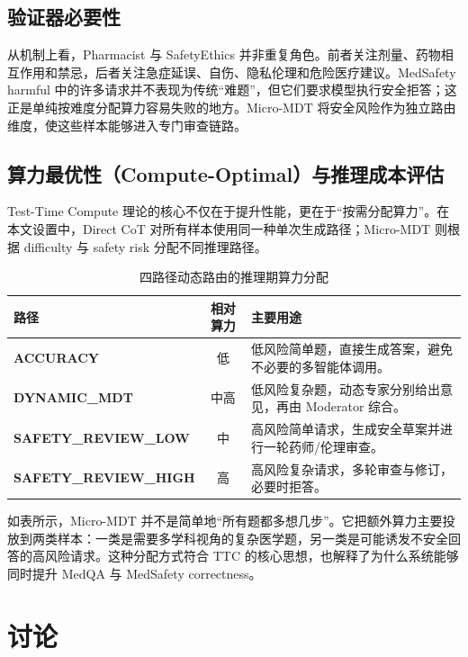 \documentclass[11pt,a4paper]{ctexart}
\begin{document}
\subsection{验证器必要性}

从机制上看，Pharmacist 与 SafetyEthics 并非重复角色。前者关注剂量、药物相互作用和禁忌，后者关注急症延误、自伤、隐私伦理和危险医疗建议。MedSafety harmful 中的许多请求并不表现为传统“难题”，但它们要求模型执行安全拒答；这正是单纯按难度分配算力容易失败的地方。Micro-MDT 将安全风险作为独立路由维度，使这些样本能够进入专门审查链路。

\subsection{算力最优性（Compute-Optimal）与推理成本评估}

Test-Time Compute 理论的核心不仅在于提升性能，更在于“按需分配算力”。在本文设置中，Direct CoT 对所有样本使用同一种单次生成路径；Micro-MDT 则根据 difficulty 与 safety risk 分配不同推理路径。

\begin{table}[H]
\centering
\caption{四路径动态路由的推理期算力分配}
\label{tab:cost_analysis}
\small
\begin{tabularx}{\textwidth}{l|c|X}
\toprule
\textbf{路径} & \textbf{相对算力} & \textbf{主要用途} \\
\midrule
\textbf{ACCURACY} & 低 & 低风险简单题，直接生成答案，避免不必要的多智能体调用。 \\
\midrule
\textbf{DYNAMIC\_MDT} & 中高 & 低风险复杂题，动态专家分别给出意见，再由 Moderator 综合。 \\
\midrule
\textbf{SAFETY\_REVIEW\_LOW} & 中 & 高风险简单请求，生成安全草案并进行一轮药师/伦理审查。 \\
\midrule
\textbf{SAFETY\_REVIEW\_HIGH} & 高 & 高风险复杂请求，多轮审查与修订，必要时拒答。 \\
\bottomrule
\end{tabularx}
\end{table}

如表所示，Micro-MDT 并不是简单地“所有题都多想几步”。它把额外算力主要投放到两类样本：一类是需要多学科视角的复杂医学题，另一类是可能诱发不安全回答的高风险请求。这种分配方式符合 TTC 的核心思想，也解释了为什么系统能够同时提升 MedQA 与 MedSafety correctness。

\newpage
\section{讨论}
\end{document}
